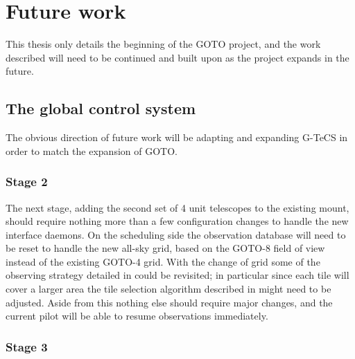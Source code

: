 \section{Future work}
\label{sec:future}
\begin{colsection}


\begin{colsection}

This thesis only details the beginning of the GOTO project, and the work described will need to be continued and built upon as the project expands in the future.

\end{colsection}


\subsection{The global control system}
\label{sec:gtecs_future}
\begin{colsection}

The obvious direction of future work will be adapting and expanding G-TeCS in order to match the expansion of GOTO.\@

\subsubsection{Stage 2}

The next stage, adding the second set of 4 unit telescopes to the existing mount, should require nothing more than a few configuration changes to handle the new  interface daemons. On the scheduling side the observation database will need to be reset to handle the new all-sky grid, based on the GOTO-8 field of view instead of the existing GOTO-4 grid. With the change of grid some of the observing strategy detailed in
could be revisited; in particular since each tile will cover a larger area the tile selection algorithm described in
might need to be adjusted. Aside from this nothing else should require major changes, and the current pilot will be able to resume observations immediately.

\subsubsection{Stage 3}


\end{colsection}
\end{colsection}
